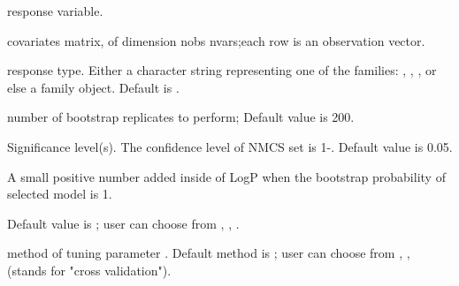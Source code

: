 \documentclass[a4paper]{book}
\begin{document}
%
\begin{Arguments}
\begin{ldescription}
\item[\code{Y}] response variable.

\item[\code{X}] covariates matrix, of dimension nobs \eqn{\times}{} nvars;each row is an observation vector.

\item[\code{family}] response type. Either a character string representing one of
the families: , , ,
or else a  family object. Default is .

\item[\code{B}] number of bootstrap replicates to perform; Default value is 200.

\item[\code{alpha}] Significance level(s). The confidence level of NMCS set is 1-.
Default value is 0.05.

\item[\code{delta}] A small positive number added inside of LogP when the bootstrap
probability of selected model is 1.

\item[\code{penalty}] Default value is ; user can choose from  ,
,  .

\item[\code{tune}] method of tuning parameter \eqn{\lambda}{}. Default method is
; user can choose from  ,
,  (stands for "cross validation").
\end{ldescription}
\end{Arguments}
%
\end{document}
